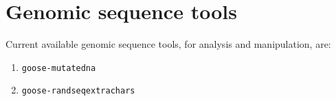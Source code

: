 \chapter{Genomic sequence tools}
\label{gst}

Current available genomic sequence tools, for analysis and manipulation, are:
\begin{enumerate}
\item \texttt{goose-mutatedna}
\item \texttt{goose-randseqextrachars}
\end{enumerate}



